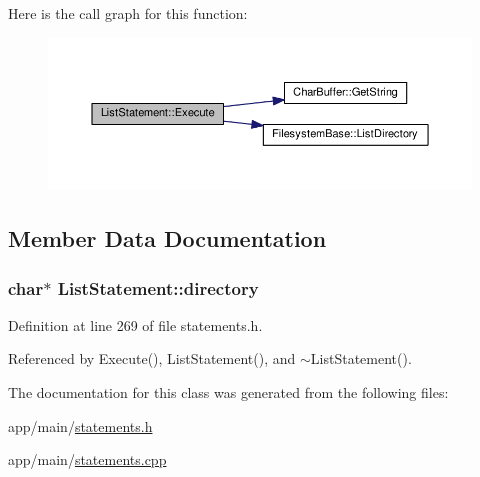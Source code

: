 Here is the call graph for this function\+:\nopagebreak
\begin{figure}[H]
\begin{center}
\leavevmode
\includegraphics[width=350pt]{classListStatement_a49cc9fe49b665a1276f288c069e1c78b_cgraph}
\end{center}
\end{figure}




\subsection{Member Data Documentation}
\subsubsection[{\texorpdfstring{directory}{directory}}]{\setlength{\rightskip}{0pt plus 5cm}char$\ast$ List\+Statement\+::directory\hspace{0.3cm}{\ttfamily [private]}}\hypertarget{classListStatement_a248d7a5e3b315fb582dff3cf51e36006}{}\label{classListStatement_a248d7a5e3b315fb582dff3cf51e36006}


Definition at line 269 of file statements.\+h.



Referenced by Execute(), List\+Statement(), and $\sim$\+List\+Statement().



The documentation for this class was generated from the following files\+:\begin{DoxyCompactItemize}
\item 
app/main/\hyperlink{statements_8h}{statements.\+h}\item 
app/main/\hyperlink{statements_8cpp}{statements.\+cpp}\end{DoxyCompactItemize}
